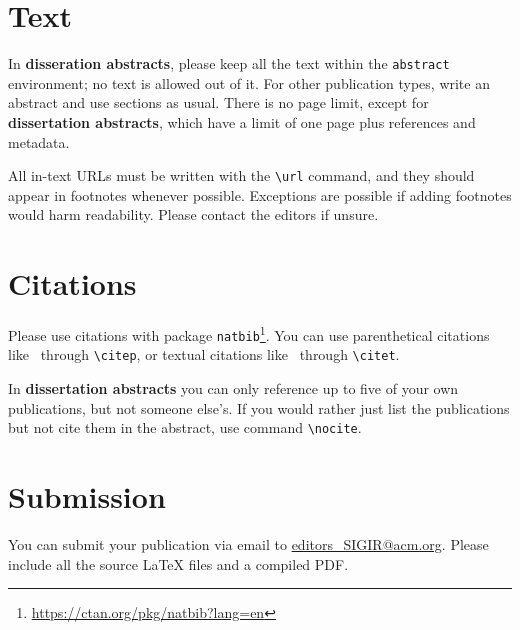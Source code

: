 \documentclass[news]{sigirforum}
\begin{document}
\section{Text}

In \textbf{disseration abstracts}, please keep all the text within the \texttt{abstract} environment; no text is allowed out of it. For other publication types, write an abstract and use sections as usual. There is no page limit, except for \textbf{dissertation abstracts}, which have a limit of one page plus references and metadata.

All in-text URLs must be written with the \texttt{\textbackslash url} command, and they should appear in footnotes whenever possible. Exceptions are possible if adding footnotes would harm readability. Please contact the editors if unsure.

\section{Citations}

Please use citations with package \texttt{natbib}\footnote{\url{https://ctan.org/pkg/natbib?lang=en}}.
You can use parenthetical citations like~\citep{forum} through \texttt{\textbackslash citep}, or textual citations like~\citet{forum} through \texttt{\textbackslash citet}.

In \textbf{dissertation abstracts} you can only reference up to five of your own publications, but not someone else's. If you would rather just list the publications but not cite them in the abstract, use command \texttt{\textbackslash nocite}.

\section{Submission}

You can submit your publication via email to \url{editors\_SIGIR@acm.org}. Please include all the source \LaTeX\xspace files and a compiled PDF.


\end{document}
